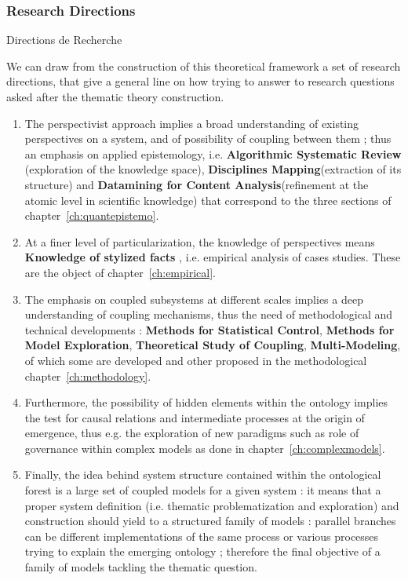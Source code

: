 \subsubsection{Research Directions}{Directions de Recherche}

We can draw from the construction of this theoretical framework a set of research directions, that give a general line on how trying to answer to research questions asked after the thematic theory construction.

\begin{enumerate}
\item The perspectivist approach implies a broad understanding of existing perspectives on a system, and of possibility of coupling between them ; thus an emphasis on applied epistemology, i.e. \textbf{Algorithmic Systematic Review} (exploration of the knowledge space), \textbf{Disciplines Mapping}(extraction of its structure) and \textbf{Datamining for Content Analysis}(refinement at the atomic level in scientific knowledge) that correspond to the three sections of chapter~\ref{ch:quantepistemo}.
\item At a finer level of particularization, the knowledge of perspectives means \textbf{Knowledge of stylized facts} 
, i.e. empirical analysis of cases studies. These are the object of chapter~\ref{ch:empirical}.
\item The emphasis on coupled subsystems at different scales implies a deep understanding of coupling mechanisms, thus the need of methodological and technical developments : \textbf{Methods for Statistical Control}, \textbf{Methods for Model Exploration}, \textbf{Theoretical Study of Coupling}, \textbf{Multi-Modeling}, of which some are developed and other proposed in the methodological chapter~\ref{ch:methodology}.
\item Furthermore, the possibility of hidden elements within the ontology implies the test for causal relations and intermediate processes at the origin of emergence, thus e.g. the exploration of new paradigms such as role of governance within complex models as done in chapter~\ref{ch:complexmodels}.
\item Finally, the idea behind system structure contained within the ontological forest is a large set of coupled models for a given system : it means that a proper system definition (i.e. thematic problematization and exploration) and construction should yield to a structured family of models : parallel branches can be different implementations of the same process or various processes trying to explain the emerging ontology ; therefore the final objective of a family of models tackling the thematic question.
\end{enumerate}






